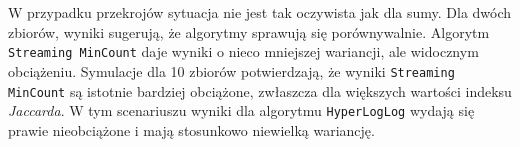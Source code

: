 W przypadku przekrojów sytuacja nie jest tak oczywista jak dla sumy. Dla dwóch zbiorów, wyniki sugerują, że algorytmy sprawują się porównywalnie. 
Algorytm \texttt{Streaming MinCount} daje wyniki o nieco mniejszej wariancji, ale widocznym obciążeniu. 
Symulacje dla 10 zbiorów potwierdzają, że wyniki \texttt{Streaming MinCount} są istotnie bardziej obciążone, 
zwłaszcza dla większych wartości indeksu \textit{Jaccarda}.
W tym scenariuszu wyniki dla algorytmu \texttt{HyperLogLog} wydają się prawie nieobciążone i mają stosunkowo niewielką wariancję.

